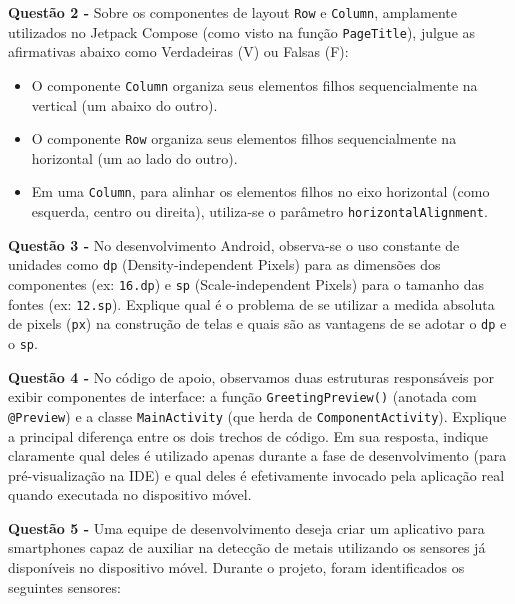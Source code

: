 \documentclass[12pt,a4paper]{article}
\newcommand{\resposta}[1]{
\noindent
\framebox[\textwidth]{
\begin{minipage}{0.98\textwidth}
\vspace*{#1}\null
\end{minipage}
}
}
\begin{document}
\textbf{Questão 2 - } Sobre os componentes de layout \texttt{Row} e \texttt{Column}, amplamente utilizados no Jetpack Compose (como visto na função \texttt{PageTitle}), julgue as afirmativas abaixo como Verdadeiras (V) ou Falsas (F):

\begin{itemize}[label={(\ \ \ )}]
    \item O componente \texttt{Column} organiza seus elementos filhos sequencialmente na vertical (um abaixo do outro).
    \item O componente \texttt{Row} organiza seus elementos filhos sequencialmente na horizontal (um ao lado do outro).
    \item Em uma \texttt{Column}, para alinhar os elementos filhos no eixo horizontal (como esquerda, centro ou direita), utiliza-se o parâmetro \texttt{horizontalAlignment}.
\end{itemize}

\vspace{0.5cm}

\textbf{Questão 3 - } No desenvolvimento Android, observa-se o uso constante de unidades como \texttt{dp} (Density-independent Pixels) para as dimensões dos componentes (ex: \texttt{16.dp}) e \texttt{sp} (Scale-independent Pixels) para o tamanho das fontes (ex: \texttt{12.sp}). Explique qual é o problema de se utilizar a medida absoluta de pixels (\texttt{px}) na construção de telas e quais são as vantagens de se adotar o \texttt{dp} e o \texttt{sp}.

\vspace{0.3cm}
\resposta{7cm}

\vspace{0.5cm}

\textbf{Questão 4 - } No código de apoio, observamos duas estruturas responsáveis por exibir componentes de interface: a função \texttt{GreetingPreview()} (anotada com \texttt{@Preview}) e a classe \texttt{MainActivity} (que herda de \texttt{ComponentActivity}). Explique a principal diferença entre os dois trechos de código. Em sua resposta, indique claramente qual deles é utilizado apenas durante a fase de desenvolvimento (para pré-visualização na IDE) e qual deles é efetivamente invocado pela aplicação real quando executada no dispositivo móvel.

\vspace{0.3cm}
\resposta{6cm}

\vspace{0.5cm}

\textbf{Questão 5 - } Uma equipe de desenvolvimento deseja criar um aplicativo para smartphones capaz de auxiliar na detecção de metais utilizando os sensores já disponíveis no dispositivo móvel. Durante o projeto, foram identificados os seguintes sensores:
\end{document}
